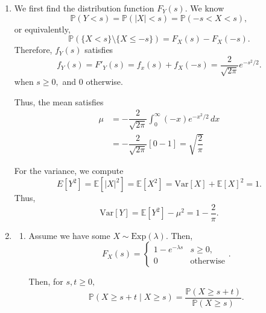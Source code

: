 \documentclass[12pt]{article}
\begin{document}
\begin{enumerate}
    Otherwise, when $s > 0,$ we have
    \begin{align*}
      F_X(s) &= F_X(0) + \dfrac{1}{2}\int_{0}^{s} e^{-x} \, dx \\
      &= \dfrac{1}{2} + \dfrac{1 - e^{-s}}{2} = 1 - \dfrac{e^{-s}}{2}.
    \end{align*}

    Therefore, the distribution function is $F_X : \mathbb R \to [0, 1]$
    $$
    F_X(s) =
    \begin{cases}
      \dfrac{e^s}{2}  & s \leq 0 \\
      1 - \dfrac{e^{-s}}{2} & s > 0
    \end{cases} .
    $$
    \qed

  \item We first find the distribution function $F_Y(s).$ We know
    $$
    \mathbb P(Y < s) = \mathbb P(|X| < s) = \mathbb P(-s < X < s),
    $$
    or equivalently,
    $$
    \mathbb P(\{X < s\} \setminus \{X \leq -s\}) = F_X(s) - F_X(-s).
    $$
    Therefore, $f_Y(s)$ satisfies
    $$
    f_Y(s) = F'_Y(s) = f_x(s) + f_X(-s) = \dfrac{2}{\sqrt{2\pi}} e^{-s^2/2}.
    $$
    when $s \geq 0,$ and $0$ otherwise.

    Thus, the mean satisfies
    \begin{align*}
      \mu &= -\dfrac{2}{\sqrt{2\pi}}\int_{0}^{\infty}(-x)  e^{-x^2/2} \, dx \\
      &= - \dfrac{2}{\sqrt{2\pi}} [0 - 1] = \sqrt{\dfrac{2}{\pi}}
    \end{align*}

    For the variance, we compute
    $$
    E[Y^2] = \mathbb E[|X|^2] = \mathbb E[X^2] = \text{Var}[X] +
    \mathbb E[X]^2 = 1.
    $$
    Thus,
    $$
    \text{Var}[Y] = \mathbb E[Y^2] - \mu^2=  1- \dfrac{2}{\pi}.
    $$

  \item
    \begin{enumerate}
      \item Assume we have some $X \sim \text{Exp}(\lambda).$ Then,
        $$
        F_X(s) =
        \begin{cases}
          1 - e^{-\lambda s} & s \geq 0, \\
          0 & \text{otherwise}
        \end{cases}.
        $$

        Then, for $s, t \geq 0,$ $$
        \mathbb P(X \geq s + t \mid X \geq s) = \dfrac{\mathbb P(X
        \geq s + t)}{\mathbb P(X \geq s)}.
        $$


\end{enumerate}
\end{enumerate}
\end{document}
